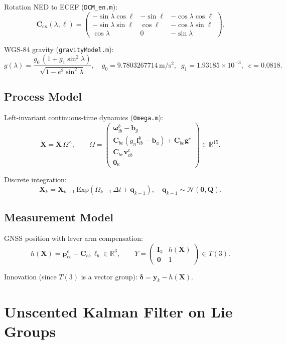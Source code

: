 \documentclass[11pt,a4paper]{article}
\theoremstyle{definition}
\theoremstyle{plain}
\newcommand{\Exp}{\mathrm{Exp}}
\newcommand{\Ceb}{\mathbf{C}_{eb}}
\newcommand{\veb}{\mathbf{v}_{eb}^e}
\newcommand{\peb}{\mathbf{p}_{eb}^e}
\newcommand{\ba}{\mathbf{b}_a}
\newcommand{\bg}{\mathbf{b}_g}
\newcommand{\fib}{\mathbf{f}_{ib}^b}
\newcommand{\wib}{\bm{\omega}_{ib}^b}
\newcommand{\bX}{\mathbf{X}}
\newcommand{\bQ}{\mathbf{Q}}
\begin{document}
Rotation NED to ECEF (\texttt{DCM\_en.m}):
\[
  \mathbf{C}_{en}(\lambda,\ell) =
  \begin{pmatrix}
    -\sin\lambda\cos\ell & -\sin\ell & -\cos\lambda\cos\ell \\
    -\sin\lambda\sin\ell &  \cos\ell & -\cos\lambda\sin\ell \\
     \cos\lambda         &  0        & -\sin\lambda
  \end{pmatrix}\!.
\]

WGS-84 gravity (\texttt{gravityModel.m}):
\[
  g(\lambda) = \frac{g_0\,(1 + g_1\sin^2\!\lambda)}
                    {\sqrt{1 - e^2\sin^2\!\lambda}},
  \quad g_0 = 9.7803267714\,\mathrm{m/s^2},\;\;
  g_1 = 1.93185\times10^{-3},\;\;
  e = 0.0818.
\]

\subsection{Process Model}

Left-invariant continuous-time dynamics (\texttt{Omega.m}):
\[
  \dot{\mathbf{X}} = \mathbf{X}\,\Omega^\wedge, \qquad
  \Omega =
  \begin{pmatrix}
    \wib - \bg \\
    \mathbf{C}_{be}(g_n\fib - \ba) + \mathbf{C}_{be}\mathbf{g}^e \\
    \mathbf{C}_{be}\veb \\
    \mathbf{0}_6
  \end{pmatrix}\!\in\mathbb{R}^{15}.
\]

Discrete integration:
\[
  \bX_{k} = \bX_{k-1}\,\Exp(\Omega_{k-1}\,\Delta t + \bm{q}_{k-1}),
  \quad \bm{q}_{k-1}\sim\mathcal{N}(\mathbf{0},\bQ).
\]

\subsection{Measurement Model}

GNSS position with lever arm compensation:
\[
  h(\bX) = \peb + \Ceb\,\bm\ell_b \in\mathbb{R}^3,
  \qquad
  Y = \begin{pmatrix}\mathbf{I}_3 & h(\bX) \\ \mathbf{0} & 1\end{pmatrix}\!\in T(3).
\]

Innovation (since $T(3)$ is a vector group):
$\bm\delta = \mathbf{y}_k - h(\bX)$.

\section{Unscented Kalman Filter on Lie Groups}
\end{document}
